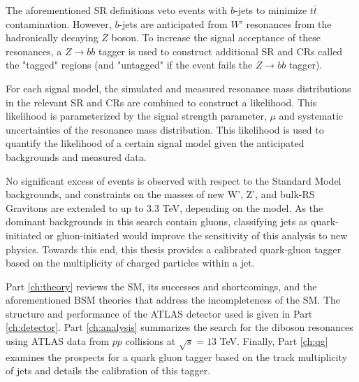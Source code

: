The aforementioned SR definitions veto events with $b$-jets to minimize $t\bar{t}$ contamination. However, $b$-jets are anticipated from $W'$ resonances from the hadronically decaying $Z$ boson. To increase the signal acceptance of these resonances, a $Z\rightarrow bb$ tagger is used to construct additional SR and CRs called the "tagged" regions (and "untagged" if the event fails the $Z\rightarrow bb$ tagger). 

For each signal model, the simulated and measured resonance mass distributions in the relevant SR and CRs are combined to construct a likelihood. This likelihood is parameterized by the signal strength parameter, $\mu$ and systematic uncertainties of the resonance mass distribution. This likelihood is used to quantify the likelihood of a certain signal model given the anticipated backgrounds and measured data.

No significant excess of events is observed with respect to the Standard Model backgrounds, and constraints on the masses of new W', Z', and bulk-RS Gravitons are extended to up to 3.3 TeV, depending on the model. As the dominant backgrounds in this search contain gluons, classifying jets as quark-initiated or gluon-initiated would improve the sensitivity of this analysis to new physics. Towards this end, this thesis provides a calibrated quark-gluon tagger based on the multiplicity of charged particles within a jet.

Part \ref{ch:theory} reviews the SM, its successes and shortcomings, and the aforementioned BSM theories that address the incompleteness of the SM. The structure and performance of the ATLAS detector used is given in Part \ref{ch:detector}. Part \ref{ch:analysis} summarizes the search for the diboson resonances using ATLAS data from $pp$ collisions at $\sqrt{s}=13$ TeV. Finally, Part \ref{ch:qg} examines the prospects for a quark gluon tagger based on the track multiplicity of jets and details the calibration of this tagger.

